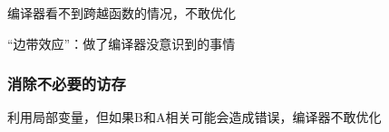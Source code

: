 \documentclass[12pt,AutoFakeBold,aspectratio=43,mathserif]{beamer}
\begin{document}
{\begin{frame}
        编译器看不到跨越函数的情况，不敢优化

        “边带效应”：做了编译器没意识到的事情


        \begin{figure}
        \end{figure}
    
    \end{frame}

    \begin{frame}
        \frametitle{消除不必要的访存}
    
        利用局部变量，但如果B和A相关可能会造成错误，编译器不敢优化

        \begin{figure}
        \end{figure}
    

\end{frame}}
\end{document}
